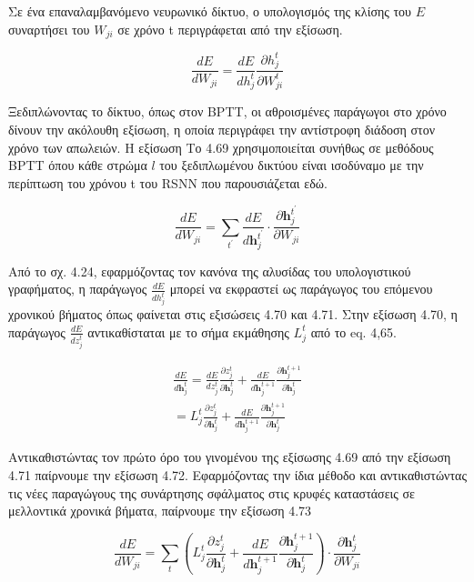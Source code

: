 \documentclass[12pt]{report}
\begin{document}
Σε ένα επαναλαμβανόμενο νευρωνικό δίκτυο, ο υπολογισμός της κλίσης του \(E\) συναρτήσει του \(W_{ji}\) σε χρόνο t περιγράφεται από την εξίσωση.

\begin{equation}
    \frac{d E}{d W_{ji}}=\frac{d E}{d h_{j}^{t}} \frac{\partial h_j^{t}}{\partial W_{ji}^{t}}
\end{equation}

Ξεδιπλώνοντας το δίκτυο, όπως στον \textlatin{BPTT}, οι αθροισμένες παράγωγοι στο χρόνο δίνουν την ακόλουθη εξίσωση, η οποία περιγράφει την αντίστροφη διάδοση στον χρόνο των απωλειών. Η εξίσωση Το 4.69 χρησιμοποιείται συνήθως σε μεθόδους \textlatin{BPTT} όπου κάθε στρώμα \(l\) του ξεδιπλωμένου δικτύου είναι ισοδύναμο με την περίπτωση του χρόνου t του \textlatin{RSNN} που παρουσιάζεται εδώ.

\begin{equation}
    \frac{d E}{d W_{j i}}=\sum_{t^{\prime}} \frac{d E}{d \mathbf{h}_{j}^{t^\prime}} \cdot \frac{\partial \mathbf{h}_{j}^{t^\prime}}{\partial W_{j i}}
\end{equation}

Από το σχ. 4.24, εφαρμόζοντας τον κανόνα της αλυσίδας του υπολογιστικού γραφήματος, η παράγωγος \(\frac{d E}{d h_{j}^{t}}\) μπορεί να εκφραστεί ως παράγωγος του επόμενου χρονικού βήματος όπως φαίνεται στις εξισώσεις 4.70 και 4.71. Στην εξίσωση 4.70, η παράγωγος \(\frac{d E}{d z_{j}^{t}}\) αντικαθίσταται με το σήμα εκμάθησης \(L_j^t\) από το eq. 4,65.

\begin{align}
    \frac{d E}{d \mathbf{h}_{j}^{t}}=\frac{d E}{d z_{j}^{t}} \frac{\partial z_{j}^{t}}{\partial \mathbf{h}_{j}^{t}}+\frac{d E}{d \mathbf{h}_{j}^{t+1}} \frac{\partial \mathbf{h}_{j}^{t+1}}{\partial \mathbf{h}_{j}^{t}} \\
    =L_j^t\frac{\partial z_{j}^{t}}{\partial \mathbf{h}_{j}^{t}}+\frac{d E}{d \mathbf{h}_{j}^{t+1}} \frac{\partial \mathbf{h}_{j}^{t+1}}{\partial \mathbf{h}_{j}^{t}}
\end{align}

Αντικαθιστώντας τον πρώτο όρο του γινομένου της εξίσωσης 4.69 από την εξίσωση 4.71 παίρνουμε την εξίσωση 4.72. Εφαρμόζοντας την ίδια μέθοδο και αντικαθιστώντας τις νέες παραγώγους της συνάρτησης σφάλματος στις κρυφές καταστάσεις σε μελλοντικά χρονικά βήματα, παίρνουμε την εξίσωση 4.73

\begin{equation}
    \frac{d E}{d W_{j i}}=\sum_{t}\left(L_{j}^{t} \frac{\partial z_{j}^{t}}{\partial \mathbf{h}_{j}^{t}}+\frac{d E}{d \mathbf{h}_{j}^{t+1}} \frac{\partial \mathbf{h}_{j}^{t+1}}{\partial \mathbf{h}_{j}^{t}}\right) \cdot \frac{\partial \mathbf{h}_{j}^{t}}{\partial W_{j i}} 
\end{equation}
\end{document}
